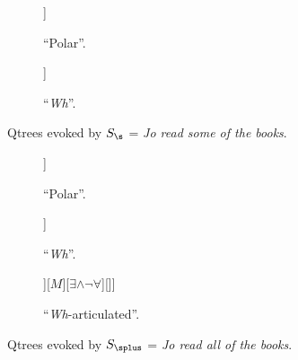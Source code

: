 \begin{figure}[H]
	\centering
	\begin{subfigure}[b]{.45\linewidth}
		\centering
		\begin{forest}
			[CS[$\neg\exists$][\fbox{$\exists$}]]
		\end{forest}
		\caption[]{``Polar''.}\label{fig7:qtree-some-polar-r}
	\end{subfigure}
	\hfill
	\begin{subfigure}[b]{.45\linewidth}
		\centering
		\begin{forest}
			[CS[$\neg\exists$][\fbox{$\exists\wedge\neg\forall$}][\fbox{$\forall$}]]
		\end{forest}
		\caption[]{``\textit{Wh}''.}\label{fig7:qtree-some-wh-r}
	\end{subfigure}
	\caption[]{Qtrees evoked by $S_{\s}$ = \textit{Jo read some of the books}. }\label{fig7:qtrees-some-r}
\end{figure}


\begin{figure}[H]
	\centering
	\begin{subfigure}[b]{.45\linewidth}
		\centering
		\begin{forest}
			[CS[$\neg\forall$][\fbox{$\forall$}]]
		\end{forest}
		\caption[]{``Polar''.}\label{fig7:qtree-all-polar-rr}
	\end{subfigure}
	\hfill
	\begin{subfigure}[b]{.45\linewidth}
		\centering
		\begin{forest}
			[CS[$\neg\exists$][$\exists\wedge\neg\forall$][\fbox{$\forall$}]]
		\end{forest}
		\caption[]{``\textit{Wh}''.}\label{fig7:qtree-all-wh-rrr}
	\end{subfigure}
	\begin{subfigure}[b]{.45\linewidth}
		\centering
		\begin{forest}
			[CS[$\neg M$ [$\neg\exists$]][$M$][$\exists\wedge\neg\forall$][\fbox{$\forall$}]]
		\end{forest}
		\caption[]{``\textit{Wh}-articulated''.}\label{fig7:qtree-all-wh-rrr}
	\end{subfigure}
	\caption[]{Qtrees evoked by $S_{\splus}$ = \textit{Jo read all of the books}. }\label{fig7:qtrees-all-rr}
\end{figure}


